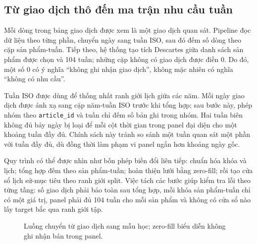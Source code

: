 \documentclass[12pt,a4paper,oneside]{article}
\begin{document}
\subsection{Từ giao dịch thô đến ma trận nhu cầu tuần}
Mỗi dòng trong bảng giao dịch được xem là một giao dịch quan sát. Pipeline đọc dữ liệu theo từng phần, chuyển ngày sang tuần ISO, sau đó đếm số dòng theo cặp sản phẩm-tuần. Tiếp theo, hệ thống tạo tích Descartes giữa danh sách sản phẩm được chọn và 104 tuần; những cặp không có giao dịch được điền 0. Do đó, một số 0 có ý nghĩa ``không ghi nhận giao dịch'', không mặc nhiên có nghĩa ``không có nhu cầu''.

Tuần ISO được dùng để thống nhất ranh giới lịch giữa các năm. Mỗi ngày giao dịch được ánh xạ sang cặp năm-tuần ISO trước khi tổng hợp; sau bước này, phép nhóm theo \texttt{article\_id} và tuần chỉ đếm số bản ghi trong nhóm. Hai tuần biên không đủ bảy ngày bị loại để mỗi cột thời gian trong panel đại diện cho một khoảng tuần đầy đủ. Chính sách này tránh so sánh một tuần quan sát một phần với tuần đầy đủ, dù đồng thời làm phạm vi panel ngắn hơn khoảng ngày gốc.

Quy trình có thể được nhìn như bốn phép biến đổi liên tiếp: chuẩn hóa khóa và lịch; tổng hợp đếm theo sản phẩm-tuần; hoàn thiện lưới bằng zero-fill; rồi tạo cửa sổ lịch sử-mục tiêu theo ranh giới split. Việc tách các bước giúp kiểm tra lỗi theo từng tầng: số giao dịch phải bảo toàn sau tổng hợp, mỗi khóa sản phẩm-tuần chỉ có một giá trị, panel phải đủ 104 tuần cho mỗi sản phẩm và không có cửa sổ nào lấy target bắc qua ranh giới tập.

\begin{figure}[!htbp]
\centering
{}
\caption{Luồng chuyển từ giao dịch sang mẫu học; zero-fill biểu diễn không ghi nhận bán trong panel.}
\label{fig:data-pipeline}
\end{figure}
\end{document}
